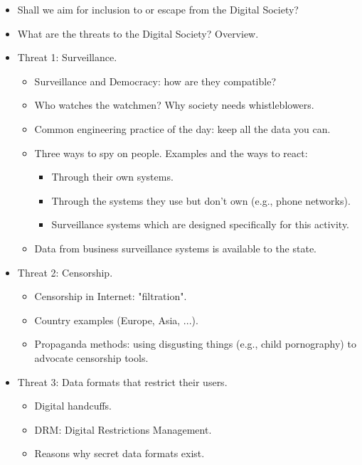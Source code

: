 \documentclass[twoside,openright]{report}
\begin{document}
\begin{itemize}
  \item     Shall we aim for inclusion to or escape from the Digital Society?
  \item     What are the threats to the Digital Society? Overview.
  \item     Threat 1: Surveillance.
\begin{itemize}
  \item         Surveillance and Democracy: how are they compatible? 
  \item         Who watches the watchmen? Why society needs whistleblowers.
  \item         Common engineering practice of the day: keep all the data you can.
  \item         Three ways to spy on people. Examples and the ways to react:
\begin{itemize}
  \item             Through their own systems.
  \item             Through the systems they use but don't own (e.g., phone networks).
  \item             Surveillance systems which are designed specifically for this activity.
\end{itemize}
  \item         Data from business surveillance systems is available to the state.
\end{itemize}
  \item     Threat 2: Censorship. 
\begin{itemize}
  \item         Censorship in Internet: "filtration".
  \item         Country examples (Europe, Asia, ...).
  \item         Propaganda methods: using disgusting things (e.g., child pornography) to advocate censorship tools.
\end{itemize}
  \item     Threat 3: Data formats that restrict their users.
\begin{itemize}
  \item         Digital handcuffs.
  \item         DRM: Digital Restrictions Management. 
  \item         Reasons why secret data formats exist.
\end{itemize}
\end{itemize}
\end{document}
